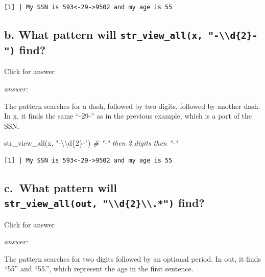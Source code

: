 \documentclass[
]{book}
\newenvironment{Shaded}{\begin{snugshade}}{\end{snugshade}}
\newcommand{\CommentTok}[1]{\textcolor[rgb]{0.56,0.35,0.01}{\textit{#1}}}
\newcommand{\FunctionTok}[1]{\textcolor[rgb]{0.00,0.00,0.00}{#1}}
\newcommand{\NormalTok}[1]{#1}
\newcommand{\SpecialCharTok}[1]{\textcolor[rgb]{0.00,0.00,0.00}{#1}}
\newcommand{\StringTok}[1]{\textcolor[rgb]{0.31,0.60,0.02}{#1}}
\begin{document}
\begin{verbatim}
[1] | My SSN is 593<-29->9502 and my age is 55
\end{verbatim}

\hypertarget{b.-what-pattern-will-str_view_allx--d2--find}{%
\subsection{\texorpdfstring{b. What pattern will \texttt{str\_view\_all(x,\ "-\textbackslash{}\textbackslash{}d\{2\}-")} find?}{b. What pattern will str\_view\_all(x, "-\textbackslash\textbackslash d\{2\}-") find?}}\label{b.-what-pattern-will-str_view_allx--d2--find}}

Click for answer

\emph{answer:}

The pattern searches for a dash, followed by two digits, followed by another dash. In x, it finds the same ``-29-'' as in the previous example, which is a part of the SSN.

\begin{Shaded}
\begin{Highlighting}[]
\FunctionTok{str\_view\_all}\NormalTok{(x, }\StringTok{"{-}}\SpecialCharTok{\textbackslash{}\textbackslash{}}\StringTok{d\{2\}{-}"}\NormalTok{)  }\CommentTok{\# "{-}" then 2 digits then "{-}"}
\end{Highlighting}
\end{Shaded}

\begin{verbatim}
[1] | My SSN is 593<-29->9502 and my age is 55
\end{verbatim}

\hypertarget{c.-what-pattern-will-str_view_allout-d2.-find}{%
\subsection{\texorpdfstring{c.~What pattern will \texttt{str\_view\_all(out,\ "\textbackslash{}\textbackslash{}d\{2\}\textbackslash{}\textbackslash{}.*")} find?}{c.~What pattern will str\_view\_all(out, "\textbackslash\textbackslash d\{2\}\textbackslash\textbackslash.*") find?}}\label{c.-what-pattern-will-str_view_allout-d2.-find}}

Click for answer

\emph{answer:}

The pattern searches for two digits followed by an optional period. In out, it finds ``55'' and ``55.'', which represent the age in the first sentence.
\end{document}
